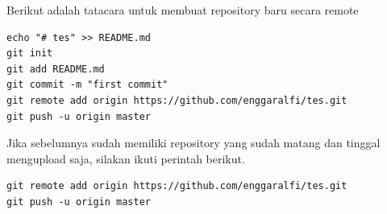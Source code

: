 \documentclass[12pt,a4paper]{article}
\begin{document}
Berikut adalah tatacara untuk membuat repository baru secara remote
\begin{verbatim}
echo "# tes" >> README.md
git init
git add README.md
git commit -m "first commit"
git remote add origin https://github.com/enggaralfi/tes.git
git push -u origin master
\end{verbatim}

Jika sebelumnya sudah memiliki repository yang sudah matang dan tinggal mengupload saja, silakan ikuti perintah berikut.

\begin{verbatim}
git remote add origin https://github.com/enggaralfi/tes.git
git push -u origin master
\end{verbatim}
\end{document}
